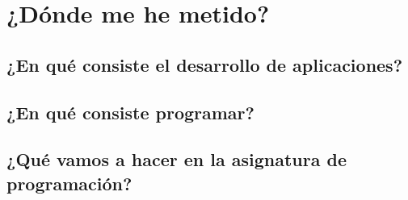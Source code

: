 
\chapter{¿Dónde me he metido?}

\section{¿En qué consiste el desarrollo de aplicaciones?}

\section{¿En qué consiste programar?}

\section{¿Qué vamos a hacer en la asignatura de programación?}

